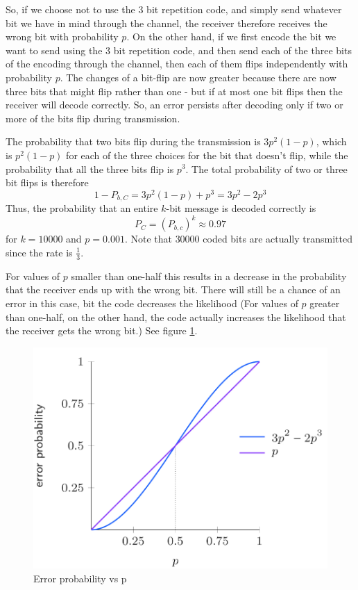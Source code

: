 \documentclass[12pt, oneside]{book}
\theoremstyle{definition}
\theoremstyle{definition}
\theoremstyle{remark}
\begin{document}
So, if we choose  not to use the $3$ bit repetition code, and simply send whatever bit we have in mind through the channel, the receiver therefore receives the wrong bit with probability $p$. On the other hand, if we first encode the bit we want to send using the $3$ bit repetition code, and then send each of the three bits of the encoding through the channel, then each of them flips independently with probability $p$. The changes of a bit-flip are now greater because there are now three bits that might flip rather than one - but if at most one bit flips then the receiver will decode correctly. So, an error persists after decoding only if two or more of the bits flip during transmission.

The probability that two bits flip during the transmission is $3p^2(1-p)$, which is $p^2(1-p)$ for each of the three choices for the bit that doesn't flip, while the probability that all the three bits flip is $p^3$. The total probability of two or three bit flips is therefore
\[
1-P_{b,C}=3p^2(1-p) + p^3 = 3p^2-2p^3
\]
Thus, the probability that an entire $k$-bit message is decoded correctly is
\[
P_C=(P_{b,c})^k\approx 0.97
\]
for $k=10000$ and $p=0.001$. Note that $30000$ coded bits are actually transmitted since the rate is $\frac{1}{3}$.

For values of $p$ smaller than one-half this results in a decrease in the probability that the receiver ends up with the wrong bit. There will still be a chance of an error in this case, bit the code decreases the likelihood (For values of $p$ greater than one-half, on the other hand, the code actually increases the likelihood that the receiver gets the wrong bit.) See figure \ref{fig:errrprob}.
\begin{figure}[ht]
    \centering
    \includegraphics[width=0.75\linewidth]{../images/grapherr.png}
    \caption{Error probability vs p}
    \label{fig:errrprob}
\end{figure}
\end{document}
